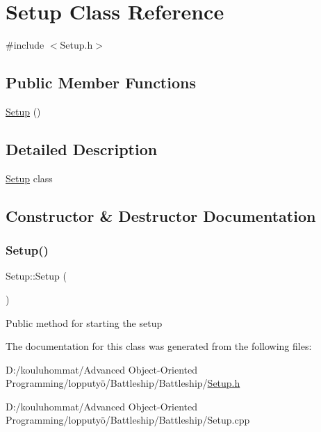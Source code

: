 \hypertarget{class_setup}{}\section{Setup Class Reference}
\label{class_setup}


{\ttfamily \#include $<$Setup.\+h$>$}

\subsection*{Public Member Functions}
\begin{DoxyCompactItemize}
\item 
\mbox{\hyperlink{class_setup_a0921e54e5a0200af117192e4c0c845b7}{Setup}} ()
\end{DoxyCompactItemize}


\subsection{Detailed Description}
\mbox{\hyperlink{class_setup}{Setup}} class 

\subsection{Constructor \& Destructor Documentation}
\mbox{\label{class_setup_a0921e54e5a0200af117192e4c0c845b7}} 
\subsubsection{\texorpdfstring{Setup()}{Setup()}}
{\footnotesize\ttfamily Setup\+::\+Setup (\begin{DoxyParamCaption}{ }\end{DoxyParamCaption})}

Public method for starting the setup 

The documentation for this class was generated from the following files\+:\begin{DoxyCompactItemize}
\item 
D\+:/kouluhommat/\+Advanced Object-\/\+Oriented Programming/lopputyö/\+Battleship/\+Battleship/\mbox{\hyperlink{_setup_8h}{Setup.\+h}}\item 
D\+:/kouluhommat/\+Advanced Object-\/\+Oriented Programming/lopputyö/\+Battleship/\+Battleship/Setup.\+cpp\end{DoxyCompactItemize}
